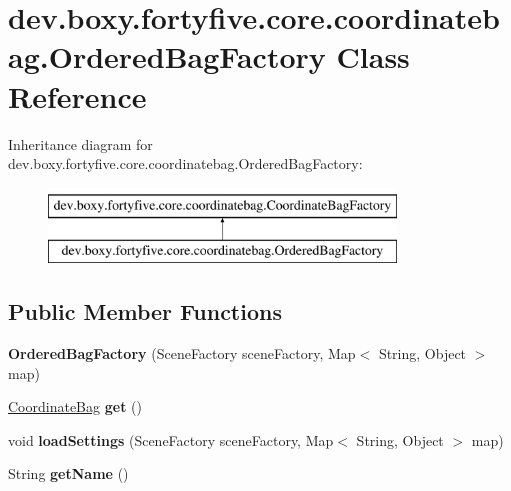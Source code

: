 \hypertarget{classdev_1_1boxy_1_1fortyfive_1_1core_1_1coordinatebag_1_1_ordered_bag_factory}{
\section{dev.boxy.fortyfive.core.coordinatebag.OrderedBagFactory Class Reference}
\label{df/d76/classdev_1_1boxy_1_1fortyfive_1_1core_1_1coordinatebag_1_1_ordered_bag_factory}
}
Inheritance diagram for dev.boxy.fortyfive.core.coordinatebag.OrderedBagFactory:\begin{figure}[H]
\begin{center}
\leavevmode
\includegraphics[height=2.000000cm]{df/d76/classdev_1_1boxy_1_1fortyfive_1_1core_1_1coordinatebag_1_1_ordered_bag_factory}
\end{center}
\end{figure}
\subsection*{Public Member Functions}
\begin{DoxyCompactItemize}
\item 
\hypertarget{classdev_1_1boxy_1_1fortyfive_1_1core_1_1coordinatebag_1_1_ordered_bag_factory_adae402cda88acf7123f6e9130e0958aa}{
{\bfseries OrderedBagFactory} (SceneFactory sceneFactory, Map$<$ String, Object $>$ map)}
\label{df/d76/classdev_1_1boxy_1_1fortyfive_1_1core_1_1coordinatebag_1_1_ordered_bag_factory_adae402cda88acf7123f6e9130e0958aa}

\item 
\hypertarget{classdev_1_1boxy_1_1fortyfive_1_1core_1_1coordinatebag_1_1_ordered_bag_factory_a452b26a3c1f85f456cd4e6695c4c7fb1}{
\hyperlink{interfacedev_1_1boxy_1_1fortyfive_1_1core_1_1coordinatebag_1_1_coordinate_bag}{CoordinateBag} {\bfseries get} ()}
\label{df/d76/classdev_1_1boxy_1_1fortyfive_1_1core_1_1coordinatebag_1_1_ordered_bag_factory_a452b26a3c1f85f456cd4e6695c4c7fb1}

\item 
\hypertarget{classdev_1_1boxy_1_1fortyfive_1_1core_1_1coordinatebag_1_1_ordered_bag_factory_abcccfc1eb71c83f1e5126c9ba5c675ae}{
void {\bfseries loadSettings} (SceneFactory sceneFactory, Map$<$ String, Object $>$ map)}
\label{df/d76/classdev_1_1boxy_1_1fortyfive_1_1core_1_1coordinatebag_1_1_ordered_bag_factory_abcccfc1eb71c83f1e5126c9ba5c675ae}

\item 
\hypertarget{classdev_1_1boxy_1_1fortyfive_1_1core_1_1coordinatebag_1_1_ordered_bag_factory_aaebfa9cffe2d52206478c74ed36a2dfb}{
String {\bfseries getName} ()}
\label{df/d76/classdev_1_1boxy_1_1fortyfive_1_1core_1_1coordinatebag_1_1_ordered_bag_factory_aaebfa9cffe2d52206478c74ed36a2dfb}

\end{DoxyCompactItemize}
